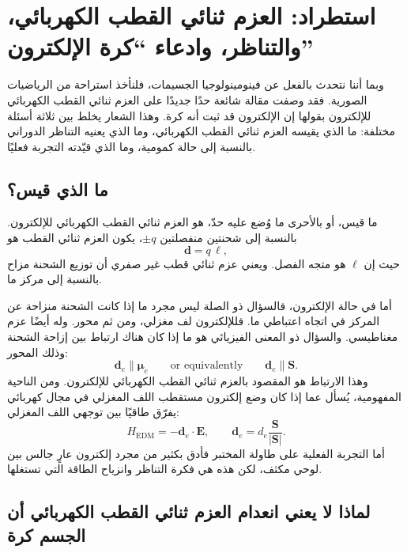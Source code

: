 \section{استطراد: العزم ثنائي القطب الكهربائي، والتناظر، وادعاء ``كرة الإلكترون''}

وبما أننا نتحدث بالفعل عن فينومينولوجيا الجسيمات، فلنأخذ استراحة من الرياضيات الصورية. فقد وصفت مقالة شائعة حدًا جديدًا على العزم ثنائي القطب الكهربائي للإلكترون بقولها إن الإلكترون قد ثبت أنه كرة. وهذا الشعار يخلط بين ثلاثة أسئلة مختلفة: ما الذي يقيسه العزم ثنائي القطب الكهربائي، وما الذي يعنيه التناظر الدوراني بالنسبة إلى حالة كمومية، وما الذي قيّدته التجربة فعليًا.

\subsection{ما الذي قيس؟}

ما قيس، أو بالأحرى ما وُضع عليه حدّ، هو العزم ثنائي القطب الكهربائي للإلكترون. بالنسبة إلى شحنتين منفصلتين \(\pm q\)، يكون العزم ثنائي القطب هو \begin{equation}
\mathbf d = q\,\boldsymbol{\ell},
\end{equation} حيث إن \(\boldsymbol{\ell}\) هو متجه الفصل. ويعني عزم ثنائي قطب غير صفري أن توزيع الشحنة مزاح بالنسبة إلى مركز ما.

أما في حالة الإلكترون، فالسؤال ذو الصلة ليس مجرد ما إذا كانت الشحنة منزاحة عن المركز في اتجاه اعتباطي ما. فللإلكترون لف مغزلي، ومن ثم محور. وله أيضًا عزم مغناطيسي. والسؤال ذو المعنى الفيزيائي هو ما إذا كان هناك ارتباط بين إزاحة الشحنة وذلك المحور: \begin{equation}
\mathbf d_e \parallel \boldsymbol{\mu}_e
\qquad \text{or equivalently} \qquad
\mathbf d_e \parallel \mathbf S .
\end{equation} وهذا الارتباط هو المقصود بالعزم ثنائي القطب الكهربائي للإلكترون. ومن الناحية المفهومية، يُسأل عما إذا كان وضع إلكترون مستقطب اللف المغزلي في مجال كهربائي يفرّق طاقيًا بين توجهي اللف المغزلي: \begin{equation}
H_{\mathrm{EDM}}=-\mathbf d_e\cdot \mathbf E,
\qquad
\mathbf d_e=d_e\frac{\mathbf S}{|\mathbf S|}.
\end{equation} أما التجربة الفعلية على طاولة المختبر فأدق بكثير من مجرد إلكترون عارٍ جالس بين لوحي مكثف، لكن هذه هي فكرة التناظر وانزياح الطاقة التي تستغلها.

\subsection{لماذا لا يعني انعدام العزم ثنائي القطب الكهربائي أن الجسم كرة}

